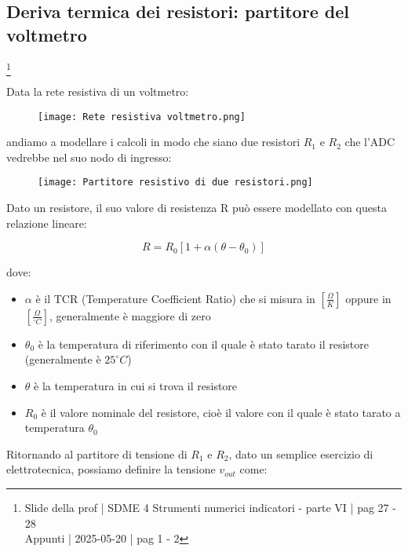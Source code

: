 \newpage 

\subsection{Deriva termica dei resistori: partitore del voltmetro}
\footnote{Slide della prof | SDME 4 Strumenti numerici indicatori - parte VI | pag 27 - 28 \\  
Appunti | 2025-05-20 | pag 1 - 2}

Data la rete resistiva di un voltmetro: 

\begin{figure}[h]
    \centering
    \texttt{[image: Rete resistiva voltmetro.png]}
\end{figure}

andiamo a modellare i calcoli in modo che siano due resistori $R_1$ e $R_2$ che l'ADC vedrebbe nel suo nodo di ingresso: 

\begin{figure}[h]
    \centering
    \texttt{[image: Partitore resistivo di due resistori.png]}
\end{figure}

Dato un resistore, 
il suo valore di resistenza R può essere modellato con questa relazione lineare: 

{
    \Large 
    \begin{equation}
        R = R_0 [1 + \alpha (\theta - \theta_0)]
    \end{equation}
}

dove:

\begin{itemize} 
    \item $\alpha$ è il TCR (Temperature Coefficient Ratio) che si misura in $[\frac{\Omega}{K}]$ oppure in $[\frac{\Omega}{^{\circ} C}]$, generalmente è maggiore di zero
    \item $\theta_0$ è la temperatura di riferimento con il quale è stato tarato il resistore (generalmente è $25 ^{\circ} C$)
    \item $\theta$ è la temperatura in cui si trova il resistore
    \item $R_0$ è il valore nominale del resistore, cioè il valore con il quale è stato tarato a temperatura $\theta_0$
\end{itemize}


Ritornando al partitore di tensione di $R_1$ e $R_2$, 
dato un semplice esercizio di elettrotecnica, 
possiamo definire la tensione $v_{out}$ come: 

